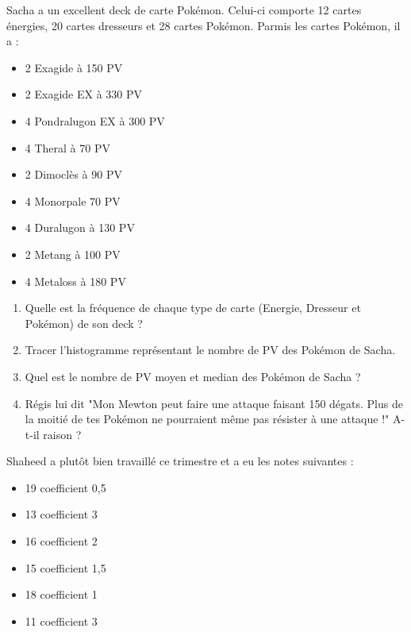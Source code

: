 
Sacha a un excellent deck de carte Pokémon. Celui-ci comporte 12 cartes énergies, 20 cartes dresseurs et 28 cartes Pokémon.
Parmis les cartes Pokémon, il a : 
\begin{multicols}{3}
    \begin{itemize}
        \item 2 Exagide à 150 PV
        \item 2 Exagide EX à 330 PV
        \item 4 Pondralugon EX à 300 PV
        \item 4 Theral à 70 PV
        \item 2 Dimoclès à 90 PV
        \item 4 Monorpale 70 PV
        \item 4 Duralugon à 130 PV
        \item 2 Metang à 100 PV
        \item 4 Metaloss à 180 PV
    \end{itemize}
\end{multicols}

\begin{enumerate}
    \item Quelle est la fréquence de chaque type de carte (Energie, Dresseur et Pokémon) de son deck ?
    \item Tracer l'histogramme représentant le nombre de PV des Pokémon de Sacha.
    \item Quel est le nombre de PV moyen et median des Pokémon de Sacha ?
    \item Régis lui dit "Mon Mewton peut faire une attaque faisant 150 dégats. Plus de la moitié de tes Pokémon ne pourraient même pas résister à une attaque !" A-t-il raison ? 
\end{enumerate}


Shaheed a plutôt bien travaillé ce trimestre et a eu les notes suivantes :
\begin{multicols}{3}
    \begin{itemize}
        \item 19 coefficient 0,5
        \item 13 coefficient 3
        \item 16 coefficient 2
        \item 15 coefficient 1,5
        \item 18 coefficient 1
        \item 11 coefficient 3
    \end{itemize}
\end{multicols}

